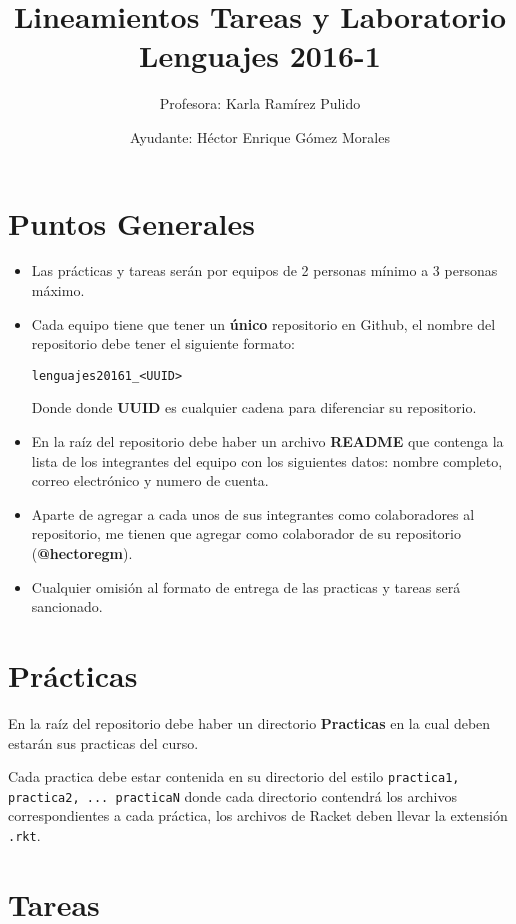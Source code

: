 \documentclass{article}
\author{Profesora: Karla Ramírez Pulido \and
  Ayudante: Héctor Enrique Gómez Morales}
\title{Lineamientos Tareas y Laboratorio  Lenguajes 2016-1}
\begin{document}
\maketitle

\section{Puntos Generales}

\begin{itemize}
\item Las prácticas y tareas serán por equipos de 2 personas mínimo a 3 personas máximo.
\item Cada equipo tiene que tener un \textbf{único} repositorio en Github, el nombre del repositorio debe tener el siguiente formato:
\begin{verbatim}
lenguajes20161_<UUID>
\end{verbatim}
Donde donde \textbf{UUID} es cualquier cadena para diferenciar su repositorio.

\item En la raíz del repositorio debe haber un archivo \textbf{README}
  que contenga la lista de los integrantes del equipo con los siguientes datos:
  nombre completo, correo electrónico y numero de cuenta.

\item Aparte de agregar a cada unos de sus integrantes como colaboradores al repositorio, me tienen que agregar como colaborador de su repositorio (\textbf{@hectoregm}).
\item Cualquier omisión al formato de entrega de las practicas y tareas será
sancionado.
\end{itemize}

\section{Prácticas}

En la raíz del repositorio debe haber un directorio \textbf{Practicas}
en la cual deben estarán sus practicas del curso.

Cada practica debe estar contenida en su directorio del estilo \texttt{practica1, practica2, ... practicaN} donde cada directorio contendrá los archivos correspondientes a cada práctica, los archivos de Racket deben llevar la extensión \texttt{.rkt}.

\section{Tareas}
\end{document}
